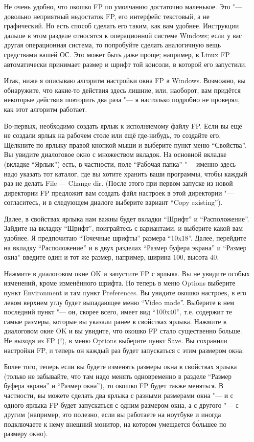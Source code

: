 Не очень удобно, что окошко FP по умолчанию достаточно маленькое. Это "--- довольно неприятный 
недостаток FP, его интерфейс текстовый, а не графический. Но есть способ сделать его таким, 
как вам удобнее. Инструкции дальше в этом разделе относятся к операционной системе Windows; если у 
вас другая операционная система, то попробуйте сделать аналогичную вещь средствами вашей ОС. 
Это может быть даже проще; например, в Linux FP автоматически принимает размер и шрифт той консоли, 
в которой его запустили.

Итак, ниже я описываю алгоритм настройки окна FP в Windows. Возможно, вы обнаружите, что какие-то 
действия здесь лишние, или, наоборот, вам придётся некоторые действия повторить два раза "--- я 
настолько подробно не проверял, как этот алгоритм работает.

Во-первых, необходимо создать ярлык к исполняемому файлу FP. Если вы ещё не создали 
ярлык на рабочем столе или ещё где-нибудь, то создайте его. Щёлкните по ярлыку правой кнопкой мыши 
и выберите пункт меню ``Свойства''. Вы увидите диалоговое окно с множеством вкладок. На основной 
вкладке (вкладке ``Ярлык'') есть, в частности, поле ``Рабочая папка'' "--- именно здесь надо 
указать тот каталог, где вы хотите хранить ваши программы, чтобы каждый раз не делать File --- 
Change dir. (После этого при первом запуске из новой директории FP предложит вам создать файл 
настроек в этой директории "--- согласитесь, и в следующем диалоге выберите вариант ``Copy existing'').

Далее, в свойствах ярлыка нам важны будет вкладки ``Шрифт'' и ``Расположение''. Зайдите на вкладку 
``Шрифт'', поиграйтесь с вариантами, и выберите какой вам удобнее. Я предпочитаю ``Точечные 
шрифты'' размера ``10x18''. Далее, перейдите на вкладку ``Расположение'' и в двух разделах ``Размер 
буфера экрана'' и ``Размер окна'' введите один и тот же размер, например, ширина 100, высота 40.

Нажмите в диалоговом окне OK и запустите FP с ярлыка. Вы не увидите особых изменений, кроме 
изменённого шрифта. Но теперь в меню Options выберите пункт Environment и там пункт Preferences. Вы 
увидите окошко настроек, в его левом верхнем углу будет выпадающее меню ``Video mode''. Выберите в 
нем последний пункт "--- он, скорее всего, имеет вид ``100x40'', т.е. содержит те самые размеры, 
которые вы указали ранее в свойствах ярлыка. Нажмите в диалоговом окне OK и вы увидите, что окошко 
FP стало существенно больше. Не выходя из FP (!), в меню Options выберите пункт Save. Вы сохранили 
настройки FP, и теперь он каждый раз будет запускаться с этим размером окна.

Более того, теперь если вы будете изменять размеры окна в свойствах 
ярлыка (только не забывайте, что там надо менять одновременно в разделе ``Размер буфера экрана'' и 
``Размер окна''), то окошко FP будет также меняться. В частности, вы можете сделать два ярлыка с 
разными размерами окна "--- и с одного ярлыка FP будет запускаться с одним размером окна, а с 
другого "--- с другим (например, это полезно, если вы работаете на ноутбуке и иногда подключаете к 
нему внешний монитор, на котором умещается б\'{о}льшее по размеру окно).

